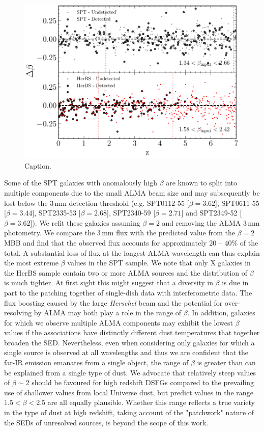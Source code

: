 \begin{figure}
	\centering
	\includegraphics[width=0.75\columnwidth]{figures/beta_simulations.pdf}
	\caption{Caption.}
	\label{fig:beta_z_simulation}
\end{figure}

Some of the SPT galaxies with anomalously high $\beta$ are known to split into multiple components due to the small ALMA beam size and may subsequently be lost below the 3\,mm detection threshold (e.g. SPT0112-55 [$\beta = 3.62$], SPT0611-55 [$\beta = 3.44$], SPT2335-53 [$\beta = 2.68$], SPT2340-59 [$\beta = 2.71$] and SPT2349-52 [$\beta = 3.62$]). We refit these galaxies assuming $\beta = 2$ and removing the ALMA 3\,mm photometry. We compare the 3\,mm flux with the predicted value from the $\beta = 2$ MBB and find that the observed flux accounts for approximately 20 -- 40\% of the total. A substantial loss of flux at the longest ALMA wavelength can thus explain the most extreme $\beta$ values in the SPT sample. We note that only {\color{red} X} galaxies in the HerBS sample contain two or more ALMA sources and the distribution of $\beta$ is much tighter. At first sight this might suggest that a diversity in $\beta$ is due in part to the patching together of single-dish data with interferometric data. The flux boosting caused by the large \textit{Herschel} beam and the potential for over-resolving by ALMA may both play a role in the range of $\beta$. In addition, galaxies for which we observe multiple ALMA components may exhibit the lowest $\beta$ values if the associations have distinctly different dust temperatures that together broaden the SED. Nevertheless, even when considering only galaxies for which a single source is observed at all wavelengths and thus we are confident that the far-IR emission emanates from a single object, the range of $\beta$ is greater than can be explained from a single type of dust. We advocate that relatively steep values of $\beta \sim 2$ should be favoured for high redshift DSFGs compared to the prevailing use of shallower values from local Universe dust, but predict values in the range $1.5 < \beta < 2.5$ are all equally plausible. Whether this range reflects a true variety in the type of dust at high redshift, taking account of the "patchwork" nature of the SEDs of unresolved sources, is beyond the scope of this work.

